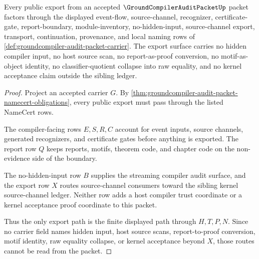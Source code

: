 \begin{theorem}
\label{thm:groundcompiler-audit-packet-export-non-escape}
Every public export from an accepted $\GroundCompilerAuditPacketUp$ packet factors through the displayed event-flow, source-channel, recognizer, certificate-gate, report-boundary, module-inventory, no-hidden-input, source-channel export, transport, continuation, provenance, and local naming rows of \autoref{def:groundcompiler-audit-packet-carrier}. The export surface carries no hidden compiler input, no host source scan, no report-as-proof conversion, no motif-as-object identity, no classifier-quotient collapse into raw equality, and no kernel acceptance claim outside the sibling ledger.
\end{theorem}
\begin{proof}
Project an accepted carrier $G$. By \autoref{thm:groundcompiler-audit-packet-namecert-obligations}, every public export must pass through the listed NameCert rows.

The compiler-facing rows $E,S,R,C$ account for event inputs, source channels, generated recognizers, and certificate gates before anything is exported. The report row $Q$ keeps reports, motifs, theorem code, and chapter code on the non-evidence side of the boundary.

The no-hidden-input row $B$ supplies the streaming compiler audit surface, and the export row $X$ routes source-channel consumers toward the sibling kernel source-channel ledger. Neither row adds a host compiler trust coordinate or a kernel acceptance proof coordinate to this packet.

Thus the only export path is the finite displayed path through $H,T,P,N$. Since no carrier field names hidden input, host source scans, report-to-proof conversion, motif identity, raw equality collapse, or kernel acceptance beyond $X$, those routes cannot be read from the packet.
\end{proof}

